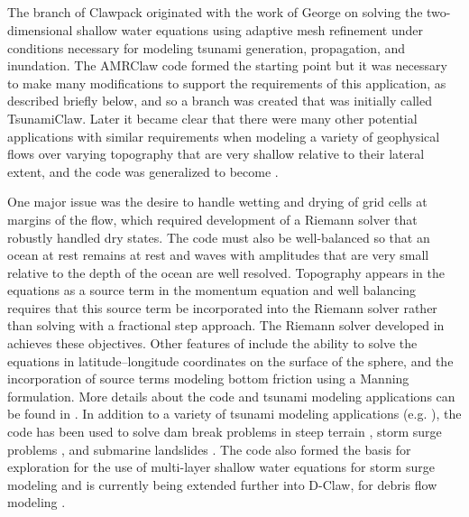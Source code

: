 %
%
%

\subsection{\geoclaw} 


The \geoclaw branch of Clawpack originated with the work of George
\cite{dgeorge:masters, dgeorge:phd, dgeorge:jcp} 
on solving the
two-dimensional shallow water equations using adaptive mesh refinement under
conditions necessary for modeling tsunami generation, propagation, and
inundation.
The AMRClaw code formed the starting point but it was necessary to make many 
modifications to support the requirements of this application, as described
briefly below, and so a branch was created that was initially called
TsunamiClaw.  Later it became clear that there were many other potential
applications with similar requirements when modeling a variety of
geophysical flows over varying topography that are very shallow 
relative to their lateral extent,
and the code was generalized to become \geoclaw.  

One major issue was the desire to handle wetting and drying of grid cells at
margins of the flow, which required development of a Riemann solver that
robustly handled dry states.  The code must also be well-balanced so that an
ocean at rest remains at rest and waves with amplitudes that are very small
relative to the depth of the ocean are well resolved.  Topography appears in
the equations as a source term in the momentum equation and well balancing
requires that this source term be incorporated into the Riemann solver
rather than solving with a fractional step approach.  The Riemann solver
developed in \cite{dgeorge:phd, dgeorge:jcp} achieves these objectives.
Other features of \geoclaw include the ability to solve the equations in
latitude--longitude coordinates on the surface of the sphere, and the
incorporation of source terms modeling bottom friction using a Manning
formulation.
More details about the code and tsunami modeling applications can be found
in \cite{BergerGeorgeLeVequeMandli:awr11, LeVequeGeorgeBerger:an11}. 
In addition to a variety of tsunami modeling applications (e.g. \cite{??}),
the \geoclaw code has been used to solve dam break problems in steep terrain
\cite{George:Malpasset}, storm surge problems \cite{Mandli:ws},
and submarine landslides \cite{??}.  The code also
formed the basis for exploration for the use of 
multi-layer shallow water equations for storm surge modeling
\cite{mandli:phd, Mandli:2011te} 
and is currently being extended further into D-Claw, for debris flow modeling 
\cite{Iverson:2014dc,George:2014gh}.

